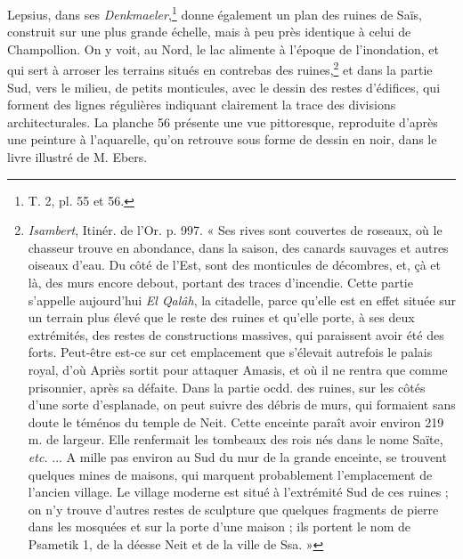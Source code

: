 \documentclass[letterpaper,twocolumn,openany,nodeprecatedcode]{dndbook}
\begin{document}
Lepsius, dans ses \emph{Denkmaeler},\footnote{T. 2, pl. 55 et 56.} donne également un plan des ruines de Saïs, construit sur une plus grande échelle, mais à peu près identique à celui de Champollion. On y voit, au Nord, le lac alimente à l'époque de l'inondation, et qui sert à arroser les terrains situés en contrebas des ruines,\footnote{\emph{Isambert}, Itinér. de l'Or. p. 997. « Ses rives sont couvertes de roseaux, où le chasseur trouve en abondance, dans la saison, des canards sauvages et autres oiseaux d'eau. Du côté de l'Est, sont des monticules de décombres, et, çà et là, des murs encore debout, portant des traces d'incendie. Cette partie s'appelle aujourd'hui \emph{El Qalâh}, la citadelle, parce qu’elle est en effet située sur un terrain plus élevé que le reste des ruines et qu'elle porte, à ses deux extrémités, des restes de constructions massives, qui paraissent avoir été des forts. Peut-être est-ce sur cet emplacement que s'élevait autrefois le palais royal, d'où Apriès sortit pour attaquer Amasis, et où il ne rentra que comme prisonnier, après sa défaite. Dans la partie ocdd. des ruines, sur les côtés d'une sorte d'esplanade, on peut suivre des débris de murs, qui formaient sans doute le téménos du temple de Neit. Cette enceinte paraît avoir environ 219 m. de largeur. Elle renfermait les tombeaux des rois nés dans le nome Saïte, \emph{etc.} ... A mille pas environ au Sud du mur de la grande enceinte, se trouvent quelques mines de maisons, qui marquent probablement l'emplacement de l'ancien village. Le village moderne est situé à l'extrémité Sud de ces ruines ; on n'y trouve d'autres restes de sculpture que quelques fragments de pierre dans les mosquées et sur la porte d'une maison ; ils portent le nom de Psametik 1, de la déesse Neit et de la ville de Ssa. »} et dans la partie Sud, vers le milieu, de petits monticules, avec le dessin des restes d'édifices, qui forment des lignes régulières indiquant clairement la trace des divisions architecturales. La planche 56 présente une vue pittoresque, reproduite d'après une peinture à l'aquarelle, qu'on retrouve sous forme de dessin en noir, dans le livre illustré de M. Ebers.
\end{document}

